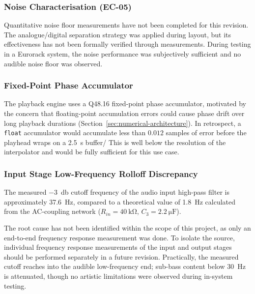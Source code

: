 \subsubsection{Noise Characterisation (EC-05)}
Quantitative noise floor measurements have not been completed for this revision.
The analogue/digital separation strategy was applied during layout, but its effectiveness has not been formally verified through measurements.
During testing in a Eurorack system, the noise performance was subjectively sufficient and no audible noise floor was observed.

\subsubsection{Fixed-Point Phase Accumulator}
The playback engine uses a Q48.16 fixed-point phase accumulator, motivated by the concern that floating-point accumulation errors could cause phase drift over long playback durations (Section~\ref{sec:numerical-architecture}).
In retrospect, a \texttt{float} accumulator would accumulate less than $0.012$ samples of error before the playhead wraps on a \qty{2.5}{\second} buffer/ This is well below the resolution of the interpolator and would be fully sufficient for this use case.

\subsubsection{Input Stage Low-Frequency Rolloff Discrepancy}
The measured \SI{-3}{\decibel} cutoff frequency of the audio input high-pass filter is approximately \SI{37.6}{\Hz}, compared to a theoretical value of \SI{1.8}{\Hz} calculated from the AC-coupling network ($R_{in} = \SI{40}{\kilo\ohm}$, $C_3 = \SI{2.2}{\micro\farad}$).

The root cause has not been identified within the scope of this project, as only an end-to-end frequency response measurement was done.
To isolate the source, individual frequency response measurements of the input and output stages should be performed separately in a future revision.
Practically, the measured cutoff reaches into the audible low-frequency end; sub-bass content below \qty{30}{\Hz} is attenuated, though no artistic limitations were observed during in-system testing.